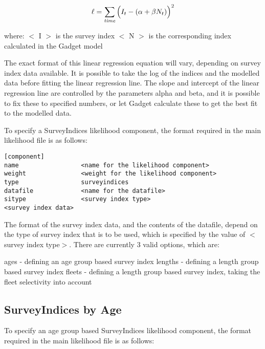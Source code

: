 \documentclass [a4paper, 10pt]{book}
\begin{document}
\newpage %
\begin{equation}\label{eq:surveyindex}
\ell = \sum_{\it time}\Big(I_{t} - (\alpha + \beta N_{t})\Big)^2
\end{equation}

where:\newline
$<$ I $>$ is the survey index\newline
$<$ N $>$ is the corresponding index calculated in the Gadget model

\bigskip
The exact format of this linear regression equation will vary, depending on survey index data available.  It is possible to take the log of the indices and the modelled data before fitting the linear regression line.  The slope and intercept of the linear regression line are controlled by the parameters alpha and beta, and it is possible to fix these to specified numbers, or let Gadget calculate these to get the best fit to the modelled data.

\bigskip
To specify a SurveyIndices likelihood component, the format required in the main likelihood file is as follows:

{\small\begin{verbatim}
[component]
name                 <name for the likelihood component>
weight               <weight for the likelihood component>
type                 surveyindices
datafile             <name for the datafile>
sitype               <survey index type>
<survey index data>
\end{verbatim}}

The format of the survey index data, and the contents of the datafile, depend on the type of survey index that is to be used, which is specified by the value of $<$survey index type$>$.  There are currently 3 valid options, which are:

\bigskip
ages - defining an age group based survey index\newline
lengths - defining a length group based survey index\newline
fleets - defining a length group based survey index, taking the fleet selectivity into account

\subsection{SurveyIndices by Age}\label{subsec:sibyage}
To specify an age group based SurveyIndices likelihood component, the format required in the main likelihood file is as follows:
\end{document}
